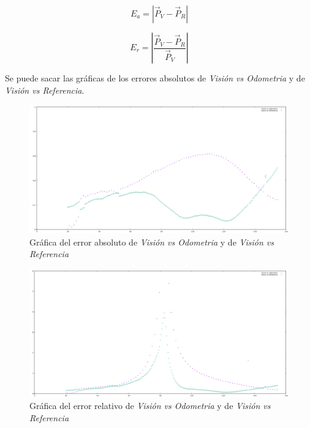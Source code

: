 \documentclass[spanish,10pt,letterpaper, twocolumn]{article}
\begin{document}
\begin{equation}
	E_a=\left| \vec{P}_V - \vec{P}_R  \right|
	\label{resultados:eq1}
\end{equation}

\begin{equation}
	E_r=\left| \frac{\vec{P}_V - \vec{P}_R}{\vec{P}_V}  \right|
	\label{resultados:eq2}
\end{equation}

Se puede sacar las gr\'aficas de los errores absolutos de \textit{Visi\'on  vs Odometria} y de \textit{Visi\'on vs Referencia}.

\begin{figure}[ht]
	\centering
	\includegraphics[scale=0.11]{errorAbsoluto.png}
	\caption{Gr\'afica del error absoluto de \textit{Visi\'on  vs Odometria} y de \textit{Visi\'on vs Referencia}}
	\label{resultados:fig3}
\end{figure}

\begin{figure}[ht]
	\centering
	\includegraphics[scale=0.11]{errorRelativo.png}
	\caption{Gr\'afica del error relativo de \textit{Visi\'on  vs Odometria} y de \textit{Visi\'on vs Referencia}}
	\label{resultados:fig4}
\end{figure}
 
\end{document}
